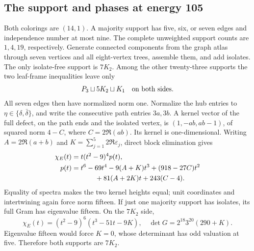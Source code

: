 \subsection{The support and phases at energy 105}
Both colorings are $(14,1)$. A majority support has five, six, or seven edges and independence number at most nine. The complete unweighted support counts are $1,4,19$, respectively. Generate connected components from the graph atlas through seven vertices and all eight-vertex trees, assemble them, and add isolates. The only isolate-free support is $7K_2$. Among the other twenty-three supports the two leaf-frame inequalities leave only
\[P_3\sqcup5K_2\sqcup K_1\quad\hbox{on both sides}.\]
All seven edges then have normalized norm one. Normalize the hub entries to $\eta\in\{\delta,\bar\delta\}$, and write the consecutive path entries $3a,3b$. A kernel vector of the full defect, on the path ends and the isolated vertex, is $(1,-ab,ab-1)$, of squared norm $4-C$, where $C=2\Re(ab)$. Its kernel is one-dimensional. Writing $A=2\Re(a+b)$ and $K=\sum_{j=1}^5 2\Re\varepsilon_j$, direct block elimination gives
\begin{align*}
\chi_E(t)&=t(t^2-9)^4p(t),\\
p(t)&=t^6-69t^4-9(A+K)t^3+(918-27C)t^2\\
&\hspace{12mm}+81(A+2K)t+243(C-4).
\end{align*}
Equality of spectra makes the two kernel heights equal; unit coordinates and intertwining again force norm fifteen. If just one majority support has isolates, its full Gram has eigenvalue fifteen. On the $7K_2$ side,
\[\chi_E(t)=(t^2-9)^6(t^3-51t-9K),\quad \det G=2^{18}3^{20}(290+K).\]
Eigenvalue fifteen would force $K=0$, whose determinant has odd valuation at five. Therefore both supports are $7K_2$.

